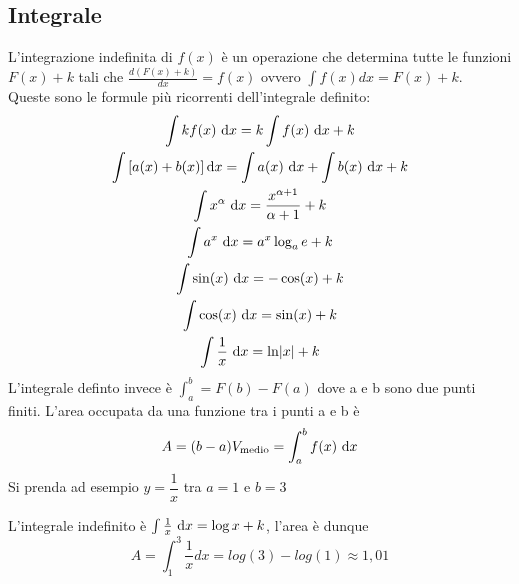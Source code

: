 \subsection{Integrale}
L'integrazione indefinita di $f(x)$ è  un operazione che determina tutte le funzioni $F(x)+k$ tali 
che $\frac{d(F(x)+k)}{dx}=f(x)$ ovvero $\int f(x)dx = F(x)+k$.\\
Queste sono le formule più ricorrenti dell'integrale definito: 
\begin{gather*}
  \int kf(x)\,\dif x=k \int f(x)\,\dif x+k\\ 
  \int\left[a(x)+b(x)\right] \dif x= \int a(x)\,\dif x + \int b(x)\,\dif x+k\\
  \int x^{\alpha}\,\dif x =\frac{x^{\alpha+1}}{\alpha+1}+k \\
  \int a^{x}\,\dif x=a^{x}\log_{a}e+k\\
  \int \sin(x)\,\dif x = -\cos(x)+k\\
  \int \cos(x)\,\dif x = \sin(x)+k\\
  \int \frac{1}{x}\,\dif x= \ln \abs{x}+k 
\end{gather*}
L'integrale definto invece è $\int_{a}^{b}=F(b)-F(a)$ dove a e b sono due punti finiti. 
L'area occupata da una funzione tra i punti a e b è 
\begin{equation*}
  A=(b-a)V_{\text{medio}}=\int_{a}^{b}f(x)\,\mathop{}\!\mathrm{d} x
\end{equation*}
Si prenda ad esempio $y=\dfrac{1}{x}$ tra $a=1$ e $b=3$ 
\begin{center}
\end{center}
L'integrale indefinito è $\int \frac{1}{x}\,\mathop{}\!\mathrm{d} x=\log x+k$, l'area è dunque 
\begin{equation*}
  A=\int_{1}^{3} \frac{1}{x} dx =log(3)-log(1) \approx 1,01
\end{equation*}
